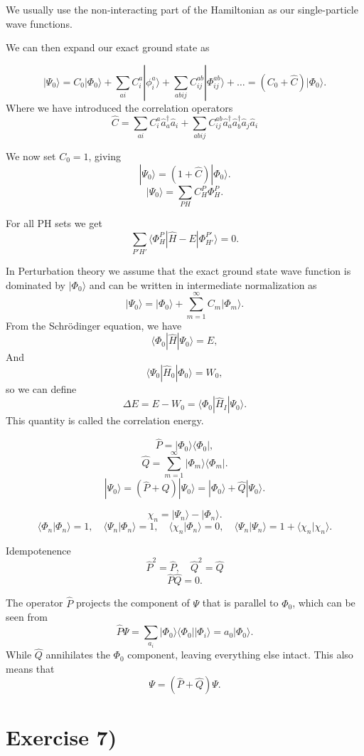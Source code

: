 \documentclass[a4paper, 11pt, notitlepage, english]{article}
\newcommand{\bra}[1]{\langle #1|}
\newcommand{\ket}[1]{|#1 \rangle}
\newcommand{\braket}[2]{\langle #1 | #2 \rangle}
\newcommand{\op}[1]{\hat{#1}}
\newcommand{\braopket}[3]{\langle #1 | {#2} | #3 \rangle}
\newcommand{\ketbra}[2]{\ket{#1}\bra{#2}}
\begin{document}
We usually use the non-interacting part of the Hamiltonian as our single-particle wave functions.

We can then expand our exact ground state as

$$\ket{\Psi_0} = C_0\ket{\Phi_0} + \sum_{ai}C_i^a \ket{\phi_i^a} + \sum_{abij}C_{ij}^{ab}\ket{\Phi_{ij}^{ab}} + \ldots = (C_0 + \op{C})\ket{\Phi_0}.$$
Where we have introduced the correlation operators
$$\op{C} = \sum_{ai}C_i^a \op{a}_{a}^\dagger \op{a}_i  + \sum_{abij}C_{ij}^{ab} \op{a}_{a}^\dagger \op{a}_{b}^\dagger \op{a}_j \op{a}_i $$

We now set $C_0 = 1$, giving
$$\ket{\Psi_0} = (1+\op{C})\ket{\Phi_0}.$$
$$\ket{\Psi_0} = \sum_{PH} C_{H}^P \Phi_H^P.$$

For all PH sets we get
$$\sum_{P'H'} \braopket{\Phi_H^P}{\op{H}-E}{\Phi_{H'}^{P'}} = 0.$$

In Perturbation theory we assume that the exact ground state wave function is dominated by $\ket{\Phi_0}$ and can be written in intermediate normalization as
$$\ket{\Psi_0} = \ket{\Phi_0} + \sum_{m=1}^\infty C_m \ket{\Phi_m}.$$
From the Schrödinger equation, we have
$$\braopket{\Phi_0}{\op{H}}{\Psi_0} = E,$$
And
$$\braopket{\Psi_0}{\op{H}_0}{\Phi_0} = W_0,$$
so we can define
$$\Delta E = E - W_0 = \braopket{\Phi_0}{\op{H}_I}{\Psi_0}.$$
This quantity is called the correlation energy.

$$\op{P} = \ketbra{\Phi_0}{\Phi_0},$$
$$\op{Q} = \sum_{m=1}^\infty \ketbra{\Phi_m}{\Phi_m}.$$
$$\ket{\Psi_0} = (\op{P} + \op{Q})\ket{\Psi_0} = \ket{\Phi_0} + \op{Q}\ket{\Psi_0}.$$

$$\chi_n = \ket{\Psi_n} - \ket{\Phi_n}.$$
$$\braket{\Phi_n}{\Phi_n} = 1, \quad \braket{\Psi_n}{\Phi_n} = 1, \quad \braket{\chi_n}{\Phi_n} = 0, \quad \braket{\Psi_n}{\Psi_n} = 1 + \braket{\chi_n}{\chi_n}.$$

Idempotenence
$$\op{P}^2 = \op{P}, \quad \op{Q}^2 = \op{Q}$$
$$\op{P}\op{Q} = 0. $$

The operator $\op{P}$ projects the component of $\Psi$ that is parallel to $\Phi_0$, which can be seen from
$$\op{P}\Psi = \sum_{a_i}\ketbra{\Phi_0}{\Phi_0}\ket{\Phi_i} = a_0\ket{\Phi_0}.$$
While $\op{Q}$ annihilates the $\Phi_0$ component, leaving everything else intact. This also means that
$$\Psi = (\op{P} + \op{Q})\Psi.$$

\clearpage

\section*{Exercise 7)}
\end{document}
